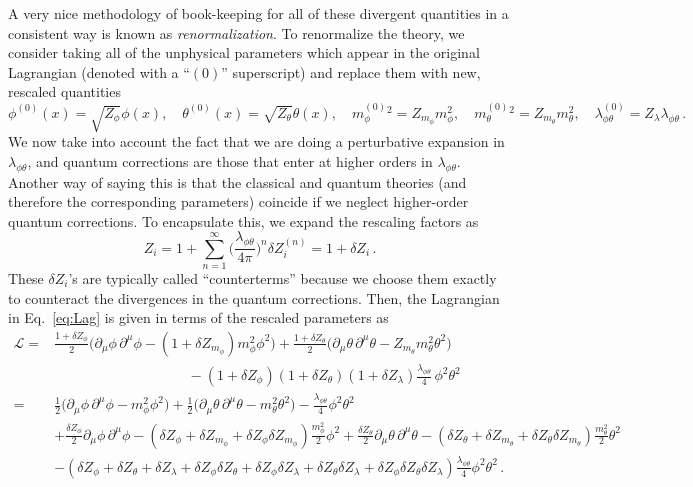 \documentclass{article}
\numberwithin{equation}{subsection}
\begin{document}
A very nice methodology of book-keeping for all of these divergent quantities in a consistent way is known as \textit{renormalization}. To renormalize the theory, we consider taking all 
of the unphysical parameters which appear in the original Lagrangian (denoted with a ``$(0)$'' superscript) and replace them with new, rescaled quantities
\begin{equation}
    \phi^{(0)}(x) = \sqrt{Z_\phi}\phi(x), \quad \theta^{(0)}(x) = \sqrt{Z_\theta}\theta(x), \quad {m_\phi^{(0)}}{}^2 = Z_{m_\phi}m_\phi^2, 
	\quad {m_\theta^{(0)}}{}^2 = Z_{m_\theta}m_\theta^2, \quad \lambda_{\phi\theta}^{(0)} = Z_\lambda \lambda_{\phi\theta}\,.
\end{equation}
We now take into account the fact that we are doing a perturbative expansion in $\lambda_{\phi\theta}$, and quantum corrections are those that enter at higher orders in 
$\lambda_{\phi\theta}$. Another way of saying this is that the classical and quantum theories (and therefore the corresponding parameters) coincide if we neglect higher-order quantum corrections. 
To encapsulate this, we expand the rescaling factors as
\begin{equation}
    Z_i = 1 + \sum_{n = 1}^\infty \Big(\frac{\lambda_{\phi\theta}}{4\pi}\Big)^n\delta Z_i^{(n)} = 1 + \delta Z_i\,.
\end{equation}
These $\delta Z_i$'s are typically called ``counterterms'' because we choose them exactly to counteract the divergences in the quantum corrections. 
Then, the Lagrangian in  Eq.~\eqref{eq:Lag} is given in terms of the rescaled parameters as
\begin{equation}\label{eq:renLag}
    \begin{split}
        \mathcal{L} =& \frac{1 + \delta Z_\phi}{2}\Big(\partial_\mu\phi\,\partial^\mu\phi - (1 + \delta Z_{m_\phi})m_\phi^2\phi^2\Big) 
	    + \frac{1 + \delta Z_\theta}{2}\Big(\partial_\mu\theta\,\partial^\mu\theta - Z_{m_\theta}m_\theta^2\theta^2\Big) \\[0.5em]
        &\hspace{4cm}- (1 + \delta Z_\phi)(1 + \delta Z_\theta)(1 + \delta Z_\lambda)\frac{\lambda_{\phi\theta}}{4}\,\phi^2\theta^2 \\[0.5em]
        =& \frac{1}{2}\Big(\partial_\mu\phi\,\partial^\mu\phi - m_\phi^2\phi^2\Big) + \frac{1}{2}\Big(\partial_\mu\theta\,\partial^\mu\theta - m_\theta^2\theta^2\Big) 
	    - \frac{\lambda_{\phi\theta}}{4}\phi^2\theta^2\\[0.5em]
        &+\frac{\delta Z_\phi}{2}\partial_\mu\phi\,\partial^\mu\phi - (\delta Z_\phi + \delta Z_{m_\phi} + \delta Z_\phi\delta Z_{m_\phi})\frac{m_\phi^2}{2}\phi^2 
	    + \frac{\delta Z_\theta}{2}\partial_\mu\theta\,\partial^\mu\theta - (\delta Z_\theta + \delta Z_{m_\theta} + \delta Z_\theta\delta Z_{m_\theta})\frac{m_\theta^2}{2}\theta^2 \\[0.5em]
        &- (\delta Z_\phi + \delta Z_\theta + \delta Z_\lambda + \delta Z_\phi \delta Z_\theta + \delta Z_\phi \delta Z_\lambda + \delta Z_\theta \delta Z_\lambda 
	    + \delta Z_\phi \delta Z_\theta\delta Z_\lambda)\frac{\lambda_{\phi\theta}}{4}\phi^2\theta^2\,.
    \end{split}
\end{equation}
\end{document}
